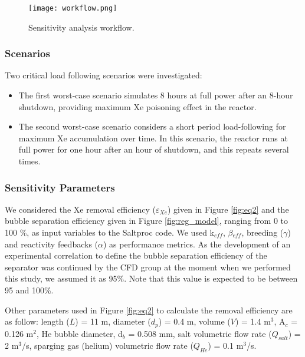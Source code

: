    \begin{figure}[htbp!]
        \begin{center}
            \texttt{[image: workflow.png]}
        \end{center}
        \caption{Sensitivity analysis workflow.}
        \label{fig:workflow}
    \end{figure}

\subsubsection{Scenarios}

    Two critical load following scenarios were investigated:
    \begin{itemize}
        \item The first worst-case scenario simulates 8 hours at full power 
                after an 8-hour shutdown, providing maximum Xe poisoning effect 
                    in the reactor.
        \item The second worst-case scenario considers a short period 
                load-following for maximum Xe accumulation over time. In this 
                    scenario, the reactor runs at full power for one hour after 
                    an hour of shutdown, and this repeats several times.
    \end{itemize}

\subsubsection{Sensitivity Parameters}

    We considered the Xe removal efficiency ($\varepsilon$$_{Xe}$) given in 
    Figure \ref{fig:eq2} and the bubble separation efficiency given in Figure 
    \ref{fig:reg_model}, ranging from 0 to 100 \%, as input variables to the 
    Saltproc code. We used k$_{eff}$, $\beta$$_{eff}$, breeding ($\gamma$) and 
    reactivity feedbacks ($\alpha$) as performance metrics. As the development 
    of an experimental correlation to define the bubble separation efficiency 
    of the separator was continued by the CFD group at the moment when we 
    performed this study, we assumed it as 95\%. Note that this value is 
    expected to be between 95 and 100\%.

    Other parameters used in Figure \ref{fig:eq2} to calculate the removal 
    efficiency are as follow: length ($L$) = 11 m, diameter ($d_p$) = 0.4 m, 
    volume ($V$) = 1.4 m$^{3}$, A$_c$ = 0.126 m$^{2}$, He bubble diameter, 
    d$_b$ = 0.508 mm, salt volumetric flow rate ($Q_{salt}$) = 2 m$^{3}$/s, 
    sparging gas (helium) volumetric flow rate ($Q_{He}$) = 0.1 m$^{3}$/s.

